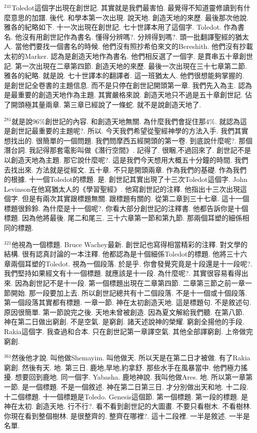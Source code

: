 \documentclass{book}
\begin{document}
$^{241}$Toledot這個字出現在創世記.
其實就是我們最害怕.
最覺得不知道靈修讀到有什麼意思的加譜.
後代.
和學本第一次出現.
說天地.
創造天地的來歷.
最後那次他說.
雅各的紀略如下.
十一次出現在創世記.
七十世譯本用了這個字.
Toledot.
作為書名.
他沒有用創世記作為書名.
懂得分辨嗎?.
分辨得到嗎?.
頭一批翻譯聖經的猶太人.
當他們要找一個書名的時候.
他們沒有照抄希伯來文的Bereshith.
他們沒有抄載太初的Marker.
認為是創造天地作為書名.
他們相反選了一個字.
是貫串五十章創世記.
第一次出現在二章第四節.
創造天地的來歷.
最後一次出現在三十七章第二節.
雅各的紀略.
就是說.
七十世譯本的翻譯者.
這一班猶太人.
他們很想能夠掌握的.
是創世記全卷書的主題信息.
而不是只停在創世記開頭第一章.
我們先入為主.
認為是最重要的創造天地作為主題.
其實嚴格來說.
創造天地只不過是五十章創世記.
佔了開頭極其量兩章.
第三章已經說了一條蛇.
就不是說創造天地了.

$^{281}$就是說96\%創世記的內容.
和創造天地無關.
為什麼我們會捉住那4\%.
就認為這是創世記最重要的主題呢?.
所以.
今天我們希望從聖經神學的方法入手.
我們其實想找出的.
很簡單的一個問題.
我們問摩西五經開頭的第一卷.
到底說什麼呢?.
那個潛台詞.
我記得那套電影叫做《潛行空間》.
記得了.
很睏,不過回來了.
創世記不是以創造天地為主題.
那它說什麼呢?.
這是我們今天想用大概五十分鐘的時間.
我們去找出來.
方法就是從經文.
五十章.
不只是開頭兩章.
作為我們的基礎.
作為我們的根據.
十一個Toledot的標題.
是.
創世記其實出現了十三次Toledot這個字.
John Levinson在他寫猶太人的《學習聖經》.
他寫創世記的注釋.
他指出十三次出現這個字.
但是有兩次其實跟標題無關.
跟標題有關的.
從第二章到三十七章.
這十一個標題很鈴鈴.
為什麼是十一個呢?.
你看大部分創世記的注釋書.
他都告訴你是十個標題.
因為他將最後.
尾二和尾三.
三十六章第一節和第九節.
那兩個耳塑的細係相同的標題.

$^{321}$他視為一個標題.
Bruce Wachey最新.
創世記也寫得相當精彩的注釋.
對文學的結構.
很有認真討論的一本注釋.
他都認為是十個細係Toledot的標題.
他將三十六章兩個耳塑的Toledot.
視為一個段落.
於是乎.
你會發覺究竟是十段還是十一段呢?.
我們堅持如果經文有十一個標題.
就應該是十一段.
為什麼呢?.
其實很容易看得出來.
因為創世記不是十一段.
第一個標題出現在二章第四節.
二章第三節之前一章一節開始.
那一段要加上去.
所以創世記總共有十二個段落.
不是十一個或十個段落.
第一個段落其實都有標題.
一章一節.
神在太初創造天地.
這是標題句.
不是敘述句.
原因很簡單.
第一節說完之後.
天地未曾被創造.
因為夏文解給我們聽.
在第八節.
神在第二日做出窮創.
不是空氣.
是窮創.
諸天述說神的榮耀.
窮創全揚他的手段.
Rakia這個字.
我查過和合本.
只在創世記第一章譯空氣.
其他全部譯窮創.
上帝做完窮創.

$^{361}$然後他才說.
叫他做Shemayim.
叫他做天.
所以天是在第二日才被做.
有了Rakia窮創.
然後有天.
地.
第三日.
鹿地,旱地,約拿舒.
那些水手在風暴當中.
他們極力搖擾.
想要回到鹿地.
同一個字.
Yabasha.
鹿地神說.
我叫他做Ares.
地.
所以第一章第一節.
是一個標題.
不是一個敘述.
神在第二日第三日.
才分別做出天和地.
十二段.
十二個標題.
十一個標題是Toledo.
Genesis這個節.
第一個標題.
第一段的標題.
是神在太初.
創造天地.
行不行?.
看不看到創世記的大圖畫.
不要只看樹木.
不看樹林.
你現在看到整個樹林.
是很整齊的.
整齊在哪裡?.
這十二段裡.
一半是敘述.
一半是名單.
\end{document}
